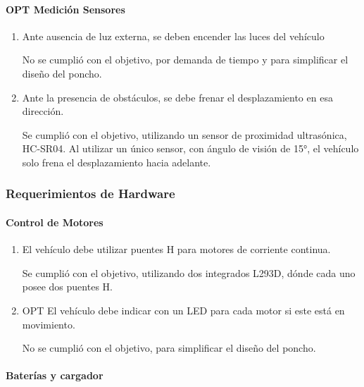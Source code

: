 \paragraph{OPT Medición Sensores}

\begin{enumerate}
\def\labelenumi{\arabic{enumi}.}
\item
  Ante ausencia de luz externa, se deben encender las luces del vehículo

  No se cumplió con el objetivo, por demanda de tiempo y para
  simplificar el diseño del poncho.
\item
  Ante la presencia de obstáculos, se debe frenar el desplazamiento en
  esa dirección.

  Se cumplió con el objetivo, utilizando un sensor de proximidad
  ultrasónica, HC-SR04. Al utilizar un único sensor, con ángulo de
  visión de 15°, el vehículo solo frena el desplazamiento hacia
  adelante.
\end{enumerate}

\subsubsection{Requerimientos de Hardware}

\paragraph{Control de Motores}

\begin{enumerate}
\def\labelenumi{\arabic{enumi}.}
\item
  El vehículo debe utilizar puentes H para motores de corriente
  continua.

  Se cumplió con el objetivo, utilizando dos integrados L293D, dónde
  cada uno posee dos puentes H.
\item
  OPT El vehículo debe indicar con un LED para cada motor si este está
  en movimiento.

  No se cumplió con el objetivo, para simplificar el diseño del poncho.
\end{enumerate}

\paragraph{Baterías y cargador}

